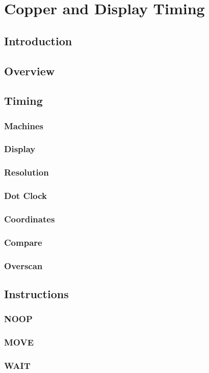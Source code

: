 \section{Copper and Display Timing}
\subsection{Introduction}
\subsection{Overview}
\subsection{Timing}
\subsubsection{Machines}
\subsubsection{Display}
\subsubsection{Resolution}
\subsubsection{Dot Clock}
\subsubsection{Coordinates}
\subsubsection{Compare}
\subsubsection{Overscan}
\subsection{Instructions}
\subsubsection{NOOP}
\subsubsection{MOVE}
\subsubsection{WAIT}
